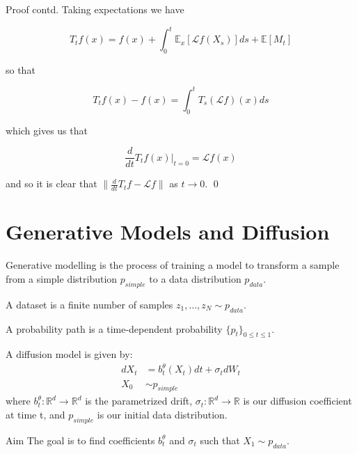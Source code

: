 \documentclass{beamer}
\newcommand\at[2]{\left.#1\right|_{#2}}
\begin{document}
\begin{frame}
	\begin{block}{Proof contd.}
	Taking expectations we have

	\begin{equation*}
		T_tf(x) = f(x) + \int_0^t \mathbb{E}_x[\mathcal{L}f(X_s)]ds + \mathbb{E}[M_t]
	\end{equation*}

	so that 

	\begin{equation*}
		T_tf(x) - f(x) = \int_0^t T_s (\mathcal{L}f)(x)ds
	\end{equation*}

	which gives us that

	\begin{equation*}
		\frac{d}{dt}\at{T_tf(x)}{t=0} = \mathcal{L}f(x)
	\end{equation*}

	and so it is clear that $\|\frac{d}{dt}T_tf - \mathcal{L}f\|$ as $t \to 0$.
	\qed
\end{block}
\end{frame}

\section{Generative Models and Diffusion}

\begin{frame}
\begin{definition}
	Generative modelling is the process of training a model to transform a sample from a simple distribution $p_{simple}$ to a data distribution $p_{data}$. 
\end{definition}
\begin{definition}[Dataset]
	A dataset is a finite number of samples $z_1,\ldots,z_N \sim p_{data}$.
\end{definition}
\begin{definition}
	A probability path is a time-dependent probability $\{p_t\}_{0 \leq t \leq 1}$.
\end{definition}
\end{frame}

\begin{frame}
\begin{definition}
	A diffusion model is given by:
	\begin{align*}
		dX_t &= b_t^{\theta}(X_t)dt + \sigma_t d W_t \\
		X_0 &\sim p_{simple}
	\end{align*}
	where $b_t^{\theta}:\mathbb{R}^d \to \mathbb{R}^d$ is the parametrized drift, $\sigma_t: \mathbb{R}^d \to \mathbb{R}$ is our diffusion coefficient at time t, and $p_{simple}$ is our initial data distribution.
\end{definition}
\begin{block}{Aim}
	The goal is to find coefficients $b_t^{\theta}$ and $\sigma_t$ such that $X_1 \sim p_{data}$.
\end{block}
\end{frame}
\end{document}
